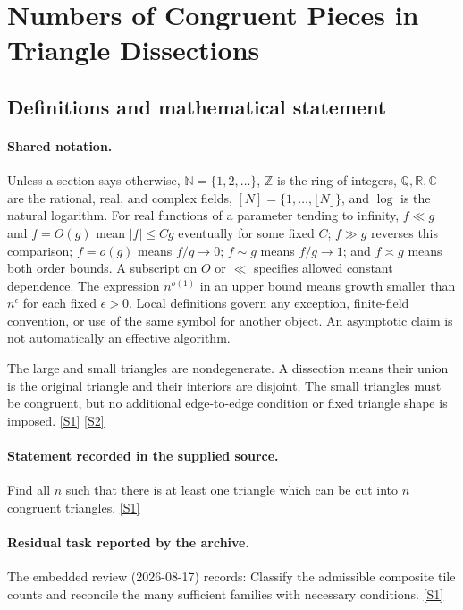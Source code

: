 \documentclass[11pt,a4paper]{article}
\newcommand{\N}{\mathbb{N}}
\newcommand{\Z}{\mathbb{Z}}
\newcommand{\Q}{\mathbb{Q}}
\newcommand{\R}{\mathbb{R}}
\newcommand{\C}{\mathbb{C}}
\newcommand{\sref}[2]{\hyperlink{source:#1:#2}{[S#2]}}
\begin{document}
\section{Numbers of Congruent Pieces in Triangle Dissections}\label{statement}


\subsection{Definitions and mathematical statement}

\paragraph{Shared notation.}Unless a section says otherwise, $\N=\{1,2,\ldots\}$,
$\Z$ is the ring of integers, $\Q,\R,\C$ are the rational, real, and complex
fields, $[N]=\{1,\ldots,\lfloor N\rfloor\}$, and $\log$ is the natural
logarithm. For real functions of a parameter tending to infinity,
$f\ll g$ and $f=O(g)$ mean $|f|\leq Cg$ eventually for some fixed $C$;
$f\gg g$ reverses this comparison; $f=o(g)$ means $f/g\to0$;
$f\sim g$ means $f/g\to1$; and $f\asymp g$ means both order bounds.
A subscript on $O$ or $\ll$ specifies allowed constant dependence.
The expression $n^{o(1)}$ in an upper bound means growth smaller than
$n^\epsilon$ for each fixed $\epsilon>0$. Local definitions govern any
exception, finite-field convention, or use of the same symbol for another
object. An asymptotic claim is not automatically an effective algorithm.



The large and small triangles are nondegenerate. A dissection means their union is the original triangle and their interiors are disjoint. The small triangles must be congruent, but no additional edge-to-edge condition or fixed triangle shape is imposed. \sref{statement}{1} \sref{statement}{2}

\paragraph{Statement recorded in the supplied source.}
Find all $n$ such that there is at least one triangle which can be cut into $n$ congruent triangles. \sref{statement}{1}

\paragraph{Residual task reported by the archive.}

The embedded review (2026-08-17) records: Classify the admissible composite tile counts and reconcile the many sufficient families with necessary conditions. \sref{statement}{1}
\end{document}

